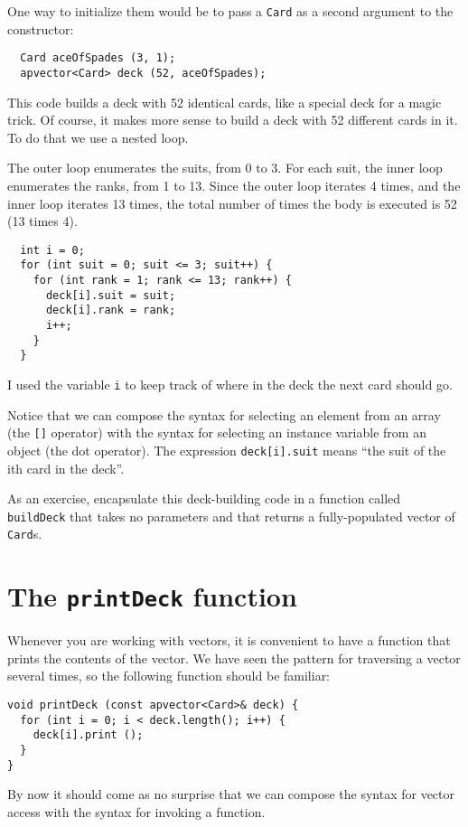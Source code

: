 One way to initialize them would be to pass a {\tt Card} as
a second argument to the constructor:

\begin{verbatim}
  Card aceOfSpades (3, 1);
  apvector<Card> deck (52, aceOfSpades);
\end{verbatim}
%
This code builds a deck with 52 identical cards, like
a special deck for a magic trick.  Of course,
it makes more sense to build a deck with 52 different cards
in it.  To do that we use a nested loop.


The outer loop enumerates the suits, from 0 to 3.  For
each suit, the inner loop enumerates the ranks, from 1
to 13.  Since the outer loop iterates 4 times, and
the inner loop iterates 13 times, the total number of times
the body is executed is 52 (13 times 4).

\begin{verbatim}
  int i = 0;
  for (int suit = 0; suit <= 3; suit++) {
    for (int rank = 1; rank <= 13; rank++) {
      deck[i].suit = suit;
      deck[i].rank = rank;
      i++;
    }
  }
\end{verbatim}
%
I used the variable {\tt i} to keep track of where in the
deck the next card should go.


Notice that we can compose the syntax for selecting an element
from an array (the {\tt []} operator) with the syntax for
selecting an instance variable from an object (the dot
operator).  The expression {\tt deck[i].suit} means 
``the suit of the ith card in the deck''.


As an exercise, encapsulate this deck-building code in a function called
{\tt buildDeck} that takes no parameters and that returns a
fully-populated vector of {\tt Card}s.

\section{The {\tt printDeck} function}
\label{printdeck}

Whenever you are working with vectors, it is convenient to have
a function that prints the contents of the vector.  We have
seen the pattern for traversing a vector several times, so the
following function should be familiar:

\begin{verbatim}
void printDeck (const apvector<Card>& deck) {
  for (int i = 0; i < deck.length(); i++) {
    deck[i].print ();
  }
}
\end{verbatim}
%
By now it should come as no surprise that we can compose the
syntax for vector access with the syntax for invoking a function.

